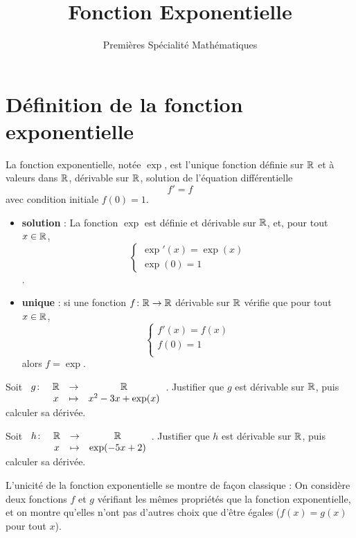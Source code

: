 \documentclass{poly}
\title{Fonction Exponentielle}
\date{}
\author{Premières Spécialité Mathématiques}
\begin{document}
\maketitle
\section{Définition de la fonction exponentielle}
\begin{definition}
La fonction exponentielle, notée $\exp$, est l'unique fonction définie sur $\mathbb{R}$ et à valeurs dans $\mathbb{R}$, dérivable sur $\mathbb{R}$, solution de l'équation différentielle
\begin{equation*}
f' = f
\end{equation*}
avec condition initiale $f(0) = 1$.
\end{definition}
\begin{remark}
\hfill
\begin{itemize}
\item \textbf{\og solution \fg} : La fonction $\exp$ est définie et dérivable sur $\mathbb{R}$, et, pour tout $x \in \mathbb{R}$, 
\begin{equation*}
\begin{cases}
\exp'(x) = \exp(x)\\
\exp(0) = 1
\end{cases}
\end{equation*}.
\item \textbf{\og unique \fg} : si une fonction $f \colon \mathbb{R} \to \mathbb{R}$ dérivable sur $\mathbb{R}$ vérifie que pour tout $x \in \mathbb{R}$, 
\begin{equation*}
\begin{cases}
f'(x) = f(x)\\
f(0) = 1\\ 
\end{cases}
\end{equation*}
alors $f = \exp$.
\end{itemize}
\end{remark}

\begin{example}
\hfill
\begin{alphaquestions}
\item Soit $\begin{array}[t]{lccc} g \colon &\mathbb{R} &\to& \mathbb{R}\\ & x &\mapsto& x^2 - 3x + \exp(x)\end{array}$. Justifier que $g$ est dérivable sur $\mathbb{R}$, puis calculer sa dérivée.
\item Soit $\begin{array}[t]{lccc} h \colon &\mathbb{R} &\to& \mathbb{R}\\ & x &\mapsto& \exp(-5x+2)\end{array}$. Justifier que $h$ est dérivable sur $\mathbb{R}$, puis calculer sa dérivée.
\end{alphaquestions}
\end{example}
\begin{remark}
L'unicité de la fonction exponentielle se montre de façon \og classique \fg : On considère deux fonctions $f$ et $g$ vérifiant les mêmes propriétés que la fonction exponentielle, et on montre qu'elles n'ont pas d'autres choix que d'être égales ($f(x) = g(x)$ pour tout $x$).
\end{remark}
\newpage
\end{document}

